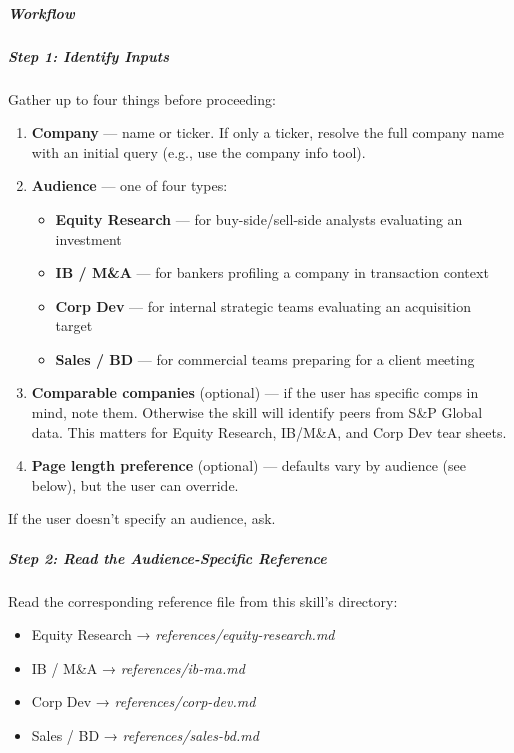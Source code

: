 \documentclass[11pt]{article}
\begin{document}
\subparagraph{Workflow}\mbox{}\par

\subparagraph{Step 1: Identify Inputs}\mbox{}\par

Gather up to four things before proceeding:


\begin{enumerate}[leftmargin=*,itemsep=2pt,topsep=2pt]
\item {} \textbf{Company} — name or ticker. If only a ticker, resolve the full company name with an initial query (e.g., use the company info tool).
\item {} \textbf{Audience} — one of four types:
\begin{itemize}[leftmargin=*,itemsep=2pt,topsep=2pt]
\item {} \textbf{Equity Research} — for buy-side/sell-side analysts evaluating an investment
\item {} \textbf{IB / M\&A} — for bankers profiling a company in transaction context
\item {} \textbf{Corp Dev} — for internal strategic teams evaluating an acquisition target
\item {} \textbf{Sales / BD} — for commercial teams preparing for a client meeting
\end{itemize}
\item {} \textbf{Comparable companies} (optional) — if the user has specific comps in mind, note them. Otherwise the skill will identify peers from S\&P Global data. This matters for Equity Research, IB/M\&A, and Corp Dev tear sheets.
\item {} \textbf{Page length preference} (optional) — defaults vary by audience (see below), but the user can override.
\end{enumerate}

If the user doesn't specify an audience, ask.


\subparagraph{Step 2: Read the Audience-Specific Reference}\mbox{}\par

Read the corresponding reference file from this skill's directory:


\begin{itemize}[leftmargin=*,itemsep=2pt,topsep=2pt]
\item {} Equity Research → \emph{references/equity-research.md}
\item {} IB / M\&A → \emph{references/ib-ma.md}
\item {} Corp Dev → \emph{references/corp-dev.md}
\item {} Sales / BD → \emph{references/sales-bd.md}
\end{itemize}
\end{document}
